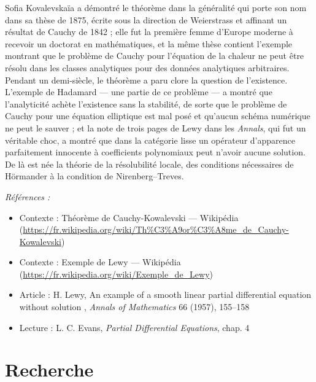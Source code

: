 \documentclass[11pt]{article}
\newenvironment{refs}{\par\small\noindent\emph{Références :}\begin{itemize}\setlength\itemsep{0pt}}{\end{itemize}\normalsize}
\begin{document}
\noindent Sofia Kovalevskaïa a démontré le théorème dans la généralité qui porte son nom
dans sa thèse de 1875, écrite sous la direction de Weierstrass et affinant un résultat de Cauchy de
1842 ; elle fut la première femme d'Europe moderne à recevoir un doctorat en mathématiques, et la
même thèse contient l'exemple montrant que le problème de Cauchy pour l'équation de la chaleur ne
peut être résolu dans les classes analytiques pour des données analytiques arbitraires. Pendant un
demi-siècle, le théorème a paru clore la question de l'existence. L'exemple de Hadamard --- une
partie de ce problème --- a montré que l'analyticité achète l'existence sans la stabilité, de sorte
que le problème de Cauchy pour une équation elliptique est mal posé et qu'aucun schéma numérique ne
peut le sauver ; et la note de trois pages de Lewy dans les \textit{Annals}, qui fut un véritable
choc, a montré que dans la catégorie lisse un opérateur d'apparence parfaitement innocente à
coefficients polynomiaux peut n'avoir aucune solution. De là est née la théorie de la résolubilité
locale, des conditions nécessaires de Hörmander à la condition de Nirenberg--Treves.

\begin{refs}
\item Contexte : Théorème de Cauchy-Kowalevski --- Wikipédia (\url{https://fr.wikipedia.org/wiki/Th%C3%A9or%C3%A8me_de_Cauchy-Kowalevski})
\item Contexte : Exemple de Lewy --- Wikipédia (\url{https://fr.wikipedia.org/wiki/Exemple_de_Lewy})
\item Article : H. Lewy, \og{} An example of a smooth linear partial differential equation without solution \fg{}, \textit{Annals of Mathematics} 66 (1957), 155--158
\item Lecture : L. C. Evans, \textit{Partial Differential Equations}, chap. 4
\end{refs}

\bigskip


\section*{Recherche}
\end{document}
